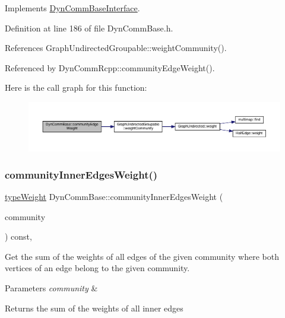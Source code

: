 Implements \hyperlink{classDynCommBaseInterface_a17c322600ba39050005153845dfd3021}{Dyn\+Comm\+Base\+Interface}.



Definition at line 186 of file Dyn\+Comm\+Base.\+h.



References Graph\+Undirected\+Groupable\+::weight\+Community().



Referenced by Dyn\+Comm\+Rcpp\+::community\+Edge\+Weight().

Here is the call graph for this function\+:
\nopagebreak
\begin{figure}[H]
\begin{center}
\leavevmode
\includegraphics[width=350pt]{classDynCommBase_a1ef408ec71d82b008fc0229416c77b61_cgraph}
\end{center}
\end{figure}
\mbox{\label{classDynCommBase_ada91e7e914eb8be7f8c25f4c0c81156a}} 
\subsubsection{\texorpdfstring{community\+Inner\+Edges\+Weight()}{communityInnerEdgesWeight()}}
{\footnotesize\ttfamily \hyperlink{edge_8h_a2e7ea3be891ac8b52f749ec73fee6dd2}{type\+Weight} Dyn\+Comm\+Base\+::community\+Inner\+Edges\+Weight (\begin{DoxyParamCaption}\item[{\hyperlink{graphUndirectedGroupable_8h_a914da95c9ea7f14f4b7f875c36818556}{type\+Community}}]{community }\end{DoxyParamCaption}) const\hspace{0.3cm}{\ttfamily [inline]}, {\ttfamily [virtual]}}

Get the sum of the weights of all edges of the given community where both vertices of an edge belong to the given community.


\begin{DoxyParams}{Parameters}
{\em community} & \\
\hline
\end{DoxyParams}
\begin{DoxyReturn}{Returns}
the sum of the weights of all inner edges 
\end{DoxyReturn}


